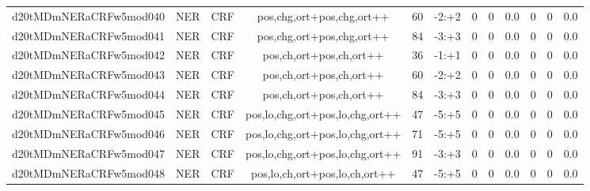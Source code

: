 \documentclass[a4paper]{article}
\begin{document}
\begin{landscape}
\begin{center}
\begin{tabular}{ |c|c|c|c|c|c|c|c|c|c|c|c|}
 
 	
 	\small{ d20tMDmNERaCRFw5mod040 } & \small{ NER} & \small{  CRF }  & pos,chg,ort+pos,chg,ort++  &  60 &  \small{  -2:+2 }  &  0 & 0 & 0.0  &  0 & 0 & 0.0 \\
 	

 
 	
 	\small{ d20tMDmNERaCRFw5mod041 } & \small{ NER} & \small{  CRF }  & pos,chg,ort+pos,chg,ort++  &  84 &  \small{  -3:+3 }  &  0 & 0 & 0.0  &  0 & 0 & 0.0 \\
 	

 
 	
 	\small{ d20tMDmNERaCRFw5mod042 } & \small{ NER} & \small{  CRF }  & pos,ch,ort+pos,ch,ort++  &  36 &  \small{  -1:+1 }  &  0 & 0 & 0.0  &  0 & 0 & 0.0 \\
 	

 
 	
 	\small{ d20tMDmNERaCRFw5mod043 } & \small{ NER} & \small{  CRF }  & pos,ch,ort+pos,ch,ort++  &  60 &  \small{  -2:+2 }  &  0 & 0 & 0.0  &  0 & 0 & 0.0 \\
 	

 
 	
 	\small{ d20tMDmNERaCRFw5mod044 } & \small{ NER} & \small{  CRF }  & pos,ch,ort+pos,ch,ort++  &  84 &  \small{  -3:+3 }  &  0 & 0 & 0.0  &  0 & 0 & 0.0 \\
 	

 
 	
 	\small{ d20tMDmNERaCRFw5mod045 } & \small{ NER} & \small{  CRF }  & pos,lo,chg,ort+pos,lo,chg,ort++  &  47 &  \small{  -5:+5 }  &  0 & 0 & 0.0  &  0 & 0 & 0.0 \\
 	

 
 	
 	\small{ d20tMDmNERaCRFw5mod046 } & \small{ NER} & \small{  CRF }  & pos,lo,chg,ort+pos,lo,chg,ort++  &  71 &  \small{  -5:+5 }  &  0 & 0 & 0.0  &  0 & 0 & 0.0 \\
 	

 
 	
 	\small{ d20tMDmNERaCRFw5mod047 } & \small{ NER} & \small{  CRF }  & pos,lo,chg,ort+pos,lo,chg,ort++  &  91 &  \small{  -3:+3 }  &  0 & 0 & 0.0  &  0 & 0 & 0.0 \\
 	

 
 	
 	\small{ d20tMDmNERaCRFw5mod048 } & \small{ NER} & \small{  CRF }  & pos,lo,ch,ort+pos,lo,ch,ort++  &  47 &  \small{  -5:+5 }  &  0 & 0 & 0.0  &  0 & 0 & 0.0 \\
 	

 
 	

\end{tabular}
\end{center}
\end{landscape}
\end{document}
